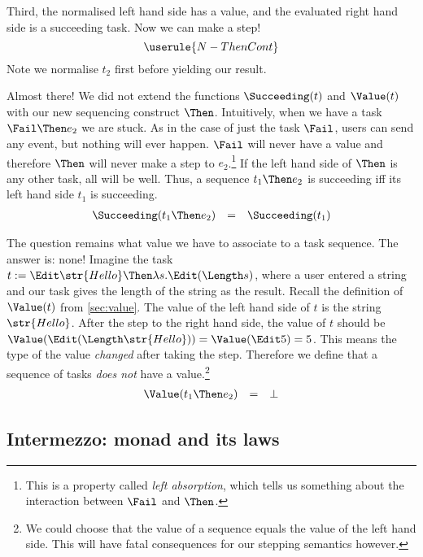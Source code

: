 Third,
the normalised left hand side has a value,
and the evaluated right hand side is a succeeding task.
Now we can make a step!
\begin{equation*}
  \userule{N-ThenCont}
\end{equation*}
Note we normalise $t_2$ first before yielding our result.

Almost there!
We did not extend the functions $\Succeeding(t)$ and $\Value(t)$ with our new sequencing construct $\Then$.
Intuitively,
when we have a task $\Fail \Then e_2$ we are stuck.
As in the case of just the task $\Fail$,
users can send any event,
but nothing will ever happen.
$\Fail$ will never have a value
and therefore $\Then$ will never make a step to $e_2$.\footnote{
  This is a property called \emph{left absorption},
  which tells us something about the interaction between $\Fail$ and $\Then$.
}
If the left hand side of $\Then$ is any other task,
all will be well.
Thus,
a sequence $t_1 \Then e_2$ is succeeding iff its left hand side $t_1$ is succeeding.
\begin{equation*}
  \begin{array}{lcl}
    \Succeeding(t_1 \Then e_2) &=& \Succeeding(t_1)
  \end{array}
\end{equation*}

The question remains what value we have to associate to a task sequence.
The answer is: none!
Imagine the task $t := \Edit \str{Hello} \Then \lambda s.\allowbreak\Edit (\Length s)$,
where a user entered a string and our task gives the length of the string as the result.
Recall the definition of $\Value(t)$ from \autoref{sec:value}.
The value of the left hand side of $t$ is the string $\str{Hello}$.
After the step to the right hand side,
the value of $t$ should be $\Value(\Edit (\Length\str{Hello})) = \Value(\Edit 5) = 5$.
This means the type of the value \emph{changed} after taking the step.
Therefore we define that a sequence of tasks \emph{does not} have a value.\footnote{
  We could choose that the value of a sequence equals the value of the left hand side.
  This will have fatal consequences for our stepping semantics however.
}
\begin{equation*}
  \begin{array}{lcl}
    \Value(t_1 \Then e_2) &=& \bot
  \end{array}
\end{equation*}


\subsection{Intermezzo: monad and its laws}

